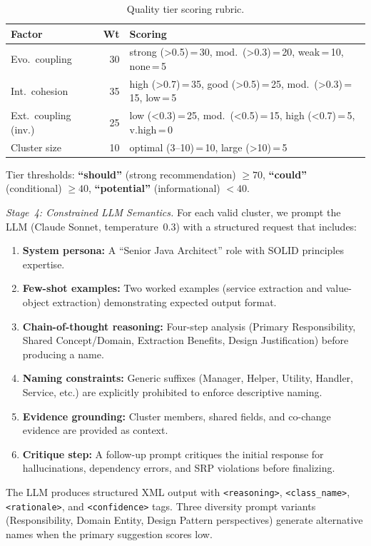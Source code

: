 \documentclass[sigconf]{acmart}
\begin{document}
\begin{table}[htbp]
\centering\scriptsize
\caption{Quality tier scoring rubric.}
\label{tab:tier-scoring}
\begin{tabularx}{\columnwidth}{@{}lrX@{}}
\toprule
\textbf{Factor} & \textbf{Wt} & \textbf{Scoring} \\
\midrule
Evo.\ coupling & 30 & strong ({>}0.5)\,=\,30, mod.\ ({>}0.3)\,=\,20, weak\,=\,10, none\,=\,5 \\
Int.\ cohesion & 35 & high ({>}0.7)\,=\,35, good ({>}0.5)\,=\,25, mod.\ ({>}0.3)\,=\,15, low\,=\,5 \\
Ext.\ coupling (inv.) & 25 & low ({<}0.3)\,=\,25, mod.\ ({<}0.5)\,=\,15, high ({<}0.7)\,=\,5, v.high\,=\,0 \\
Cluster size & 10 & optimal (3--10)\,=\,10, large ({>}10)\,=\,5 \\
\bottomrule
\end{tabularx}
\end{table}

Tier thresholds: \textbf{``should''} (strong recommendation) $\geq 70$,
\textbf{``could''} (conditional) $\geq 40$, \textbf{``potential''}
(informational) $< 40$.

\textit{Stage~4: Constrained LLM Semantics.}  For each valid cluster, we prompt
the LLM (Claude Sonnet, temperature~0.3) with a structured request that
includes:
\begin{enumerate}
  \item \textbf{System persona:}  A ``Senior Java Architect'' role with SOLID
        principles expertise.
  \item \textbf{Few-shot examples:}  Two worked examples (service extraction
        and value-object extraction) demonstrating expected output format.
  \item \textbf{Chain-of-thought reasoning:}  Four-step analysis (Primary
        Responsibility, Shared Concept/Domain, Extraction Benefits, Design
        Justification) before producing a name.
  \item \textbf{Naming constraints:}  Generic suffixes (Manager, Helper,
        Utility, Handler, Service, etc.) are explicitly prohibited to enforce
        descriptive naming.
  \item \textbf{Evidence grounding:}  Cluster members, shared fields, and
        co-change evidence are provided as context.
  \item \textbf{Critique step:}  A follow-up prompt critiques the initial
        response for hallucinations, dependency errors, and SRP violations
        before finalizing.
\end{enumerate}
The LLM produces structured XML output with \texttt{<reasoning>},
\texttt{<class\_name>}, \texttt{<rationale>}, and \texttt{<confidence>} tags.
Three diversity prompt variants (Responsibility, Domain Entity,
Design Pattern perspectives) generate alternative names when the primary
suggestion scores low.
\end{document}
